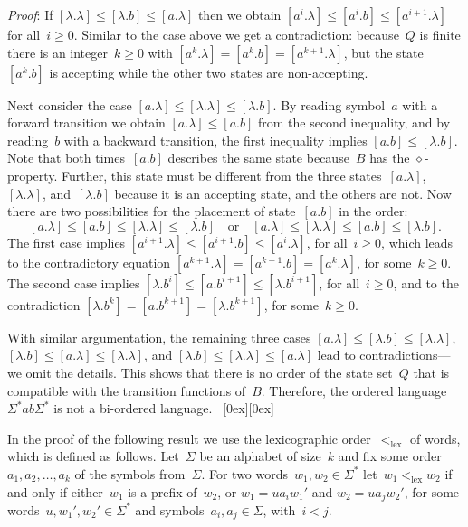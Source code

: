 \documentclass[submission]{eptcs}
\newcommand*{\qed}{\raisebox{0.5ex}[0ex][0ex]{\framebox[1ex][l]{}}}
\newenvironment{proof}{\par\noindent
  {\rmfamily\itshape\mdseries Proof\/}:\hspace{\labelsep}\ignorespaces}{\mbox{}\nolinebreak\hfill~{\qed}
  \medbreak
}
\begin{document}
\begin{proof}
  If $[\lambda.\lambda] \leq [\lambda.b] \leq [a.\lambda]$ then we
  obtain $[a^i.\lambda] \leq [a^i.b] \leq [a^{i+1}.\lambda]$ for
  all~$i\geq 0$.  Similar to the case above we get a contradiction:
  because~$Q$ is finite there is an integer~$k\geq 0$ with
  $[a^k.\lambda] = [a^k.b] = [a^{k+1}.\lambda]$, but the
  state~$[a^k.b]$ is accepting while the other two states are
  non-accepting.

  Next consider the case $[a.\lambda] \leq [\lambda.\lambda] \leq
  [\lambda.b]$.  By reading symbol~$a$ with a forward transition we
  obtain $[a.\lambda]\leq [a.b]$ from the second inequality, and by
  reading~$b$ with a backward transition, the first inequality implies
  $[a.b]\leq [\lambda.b]$.  Note that both times~$[a.b]$ describes the
  same state because~$B$ has the $\diamond$-property.  Further, this
  state must be different from the three states~$[a.\lambda]$,
  $[\lambda.\lambda]$, and~$[\lambda.b]$ because it is an accepting
  state, and the others are not.  Now there are two possibilities for
  the placement of state~$[a.b]$ in the order:
\[ [a.\lambda] \leq [a.b]\leq [\lambda.\lambda] \leq [\lambda.b]
  \quad{\text{or}}\quad [a.\lambda] \leq [\lambda.\lambda] \leq [a.b]
  \leq [\lambda.b]. \]
The first case implies $[a^{i+1}.\lambda]\leq [a^{i+1}.b] \leq
  [a^i.\lambda]$, for all~$i\geq 0$, which leads to the contradictory
  equation $[a^{k+1}.\lambda] = [a^{k+1}.b] = [a^k.\lambda]$, for
  some~$k\geq 0$.  The second case implies $[\lambda.b^i] \leq
  [a.b^{i+1}] \leq [\lambda.b^{i+1}]$, for all~$i\geq 0$, and to the
  contradiction $[\lambda.b^k] = [a.b^{k+1}] = [\lambda.b^{k+1}]$, for
  some~$k\geq 0$.

  With similar argumentation, the remaining three cases $[a.\lambda]
  \leq [\lambda.b] \leq [\lambda.\lambda]$, $[\lambda.b] \leq
  [a.\lambda] \leq [\lambda.\lambda]$, and $[\lambda.b] \leq
  [\lambda.\lambda] \leq [a.\lambda]$ lead to contradictions---we omit
  the details.  This shows that there is no order of the state set~$Q$
  that is compatible with the transition functions of~$B$.  Therefore,
  the ordered language~$\Sigma^* ab\Sigma^*$ is not a bi-ordered
  language.
\end{proof}

In the proof of the following result we use the lexicographic
order~$<_{\text{lex}}$ of words, which is defined as follows.
Let~$\Sigma$ be an alphabet of size~$k$ and fix some
order~$a_1,a_2,\dots,a_k$ of the symbols from~$\Sigma$.  For two
words~$w_1,w_2\in\Sigma^*$ let~$w_1 <_{\text{lex}} w_2$ if and only if
either~$w_1$ is a prefix of~$w_2$, or $w_1= u a_i w_1'$ and $w_2= u
a_j w_2'$, for some words~$u,w_1',w_2'\in\Sigma^*$ and
symbols~$a_i,a_j\in\Sigma$, with~$i<j$.
\end{document}
